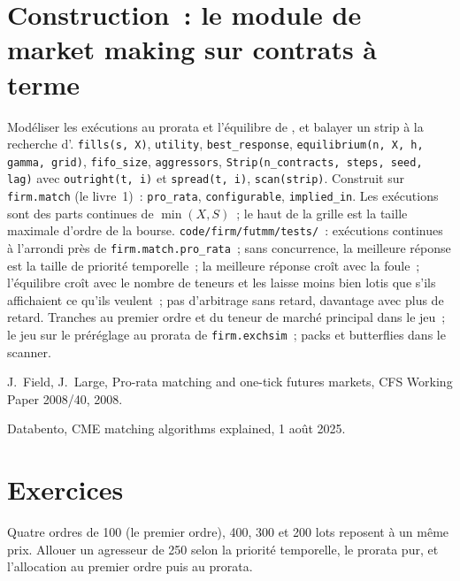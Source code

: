 \section{Construction~: le module de market making sur contrats à terme}\label{bld:hf:futures-market-making:futmm}

\begin{build}
 Modéliser les exécutions au prorata et l'équilibre de , et balayer un strip à la recherche d'.
 \texttt{fills(s, X)}, \texttt{utility}, \texttt{best\_response}, \texttt{equilibrium(n, X, h, gamma, grid)},
\texttt{fifo\_size}, \texttt{aggressors}, \texttt{Strip(n\_contracts, steps, seed, lag)} avec \texttt{outright(t, i)} et \texttt{spread(t, i)},
\texttt{scan(strip)}. Construit sur \texttt{firm.match} (le livre~1)~: \texttt{pro\_rata}, \texttt{configurable}, \texttt{implied\_in}.
 Les exécutions sont des parts continues de $\min(X,S)$~; le haut de la grille est la taille maximale d'ordre de la bourse.
 \texttt{code/firm/futmm/tests/}~: exécutions continues à l'arrondi près de \texttt{firm.match.pro\_rata}~; sans concurrence, la meilleure réponse
est la taille de priorité temporelle~; la meilleure réponse croît avec la foule~; l'équilibre croît avec le nombre de teneurs et les laisse moins bien lotis
que s'ils affichaient ce qu'ils veulent~; pas d'arbitrage sans retard, davantage avec plus de retard.
 Tranches au premier ordre et du teneur de marché principal dans le jeu~; le jeu sur le préréglage au prorata de \texttt{firm.exchsim}~; packs et butterflies dans
le scanner.
\end{build}

\begin{omsources}
\item J.~Field, J.~Large, Pro-rata matching and one-tick futures markets, CFS Working Paper 2008/40, 2008.
\item Databento, CME matching algorithms explained, 1 août 2025.
\end{omsources}

\section{Exercices}

\begin{exercise}[$\star$]\label{exo:hf:futures-market-making:1}
Quatre ordres de 100 (le premier ordre), 400, 300 et 200 lots reposent à un même prix. Allouer un agresseur de 250 selon la priorité temporelle, le prorata pur, et l'allocation au
premier ordre puis au prorata.
\end{exercise}

